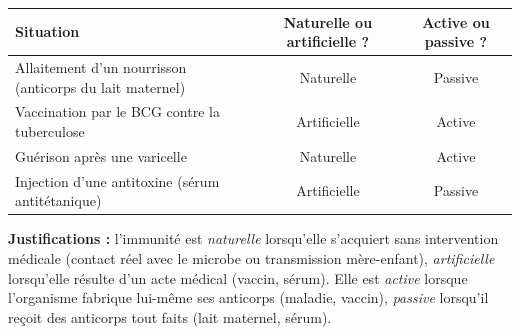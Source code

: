 \documentclass[11pt]{article}
\begin{document}
\begin{corrige}
\begin{center}
\begin{tabularx}{\linewidth}{|X|c|c|}
\hline
\rowcolor{popblueL} \textbf{Situation} & \textbf{Naturelle ou artificielle ?} & \textbf{Active ou passive ?} \\
\hline
Allaitement d'un nourrisson (anticorps du lait maternel) & Naturelle & Passive \\
\hline
Vaccination par le BCG contre la tuberculose & Artificielle & Active \\
\hline
Guérison après une varicelle & Naturelle & Active \\
\hline
Injection d'une antitoxine (sérum antitétanique) & Artificielle & Passive \\
\hline
\end{tabularx}
\end{center}
\textbf{Justifications :} l'immunité est \emph{naturelle} lorsqu'elle s'acquiert sans intervention médicale (contact réel avec le microbe ou transmission mère-enfant), \emph{artificielle} lorsqu'elle résulte d'un acte médical (vaccin, sérum). Elle est \emph{active} lorsque l'organisme fabrique lui-même ses anticorps (maladie, vaccin), \emph{passive} lorsqu'il reçoit des anticorps tout faits (lait maternel, sérum).
\end{corrige}
\end{document}
